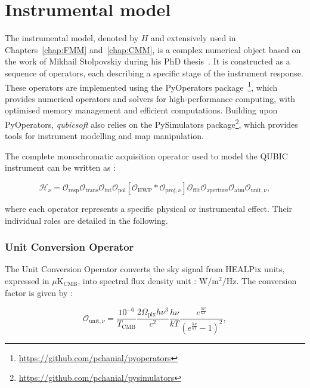 \documentclass[../../thesis.tex]{subfiles}
\begin{document}
\section{Instrumental model}

The instrumental model, denoted by $H$ and extensively used in Chapters~\ref{chap:FMM} and~\ref{chap:CMM}, is a complex numerical object based on the work of Mikhail Stolpovskiy during his PhD thesis~\cite{thesismikhail}. It is constructed as a sequence of operators, each describing a specific stage of the instrument response.
These operators are implemented using the PyOperators package~\cite{PyOperators}\footnote{\url{https://github.com/pchanial/pyoperators}}, which provides numerical operators and solvers for high-performance computing, with optimised memory management and efficient computations. Building upon PyOperators, \emph{qubicsoft} also relies on the PySimulators package\footnote{\url{https://github.com/pchanial/pysimulators}}, which provides tools for instrument modelling and map manipulation.

The complete monochromatic acquisition operator used to model the QUBIC instrument can be written as :

\begin{equation}
    \mathcal{H}_{\nu} = \mathcal{O}_{\text{resp}} \mathcal{O}_{\text{trans}} \mathcal{O}_{\text{int}} \mathcal{O}_{\text{pol}} [\mathcal{O}_{\text{HWP}} * \mathcal{O}_{\text{proj}, \nu}] \mathcal{O}_{\text{filt}} \mathcal{O}_{\text{aperture}} \mathcal{O}_{\text{atm}} \mathcal{O}_{\text{unit}, \nu},
    \label{eq:instrumental_model}
\end{equation}

where each operator represents a specific physical or instrumental effect. Their individual roles are detailed in the following.


\subsubsection{Unit Conversion Operator}

The Unit Conversion Operator converts the sky signal from HEALPix units, expressed in $\mu\text{K}_{\text{CMB}}$, into spectral flux density unit : $\text{W}/\text{m}^2/\text{Hz}$. The conversion factor is given by : 

\begin{equation}
    \mathcal{O}_{\text{unit}, \nu} = \frac{10^{-6}}{T_{\text{CMB}}} \frac{2 \Omega_{\text{pix}} h \nu^3}{c^2} \frac{h \nu}{k T} \frac{e^{\frac{h \nu}{k T}}}{(e^{\frac{h \nu}{k T}} - 1)^2},
\end{equation}
\end{document}

